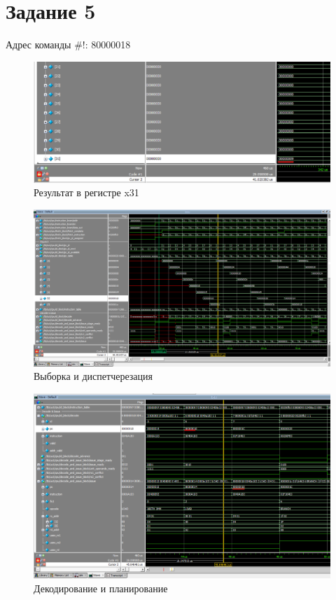 \section{Задание 5}

Адрес команды \#!: 80000018

\begin{figure}[ht!]
\centering
\includegraphics[width=170mm]{./img/task5.png}
\caption{Результат в регистре x31 \label{overflow}}
\end{figure}

\begin{figure}[ht!]
\centering
\includegraphics[width=170mm]{./img/task5_1.png}
\caption{Выборка и диспетчерезация \label{overflow}}
\end{figure}

\begin{figure}[ht!]
\centering
\includegraphics[width=170mm]{./img/task5_2.png}
\caption{Декодирование и планирование \label{overflow}}
\end{figure}

